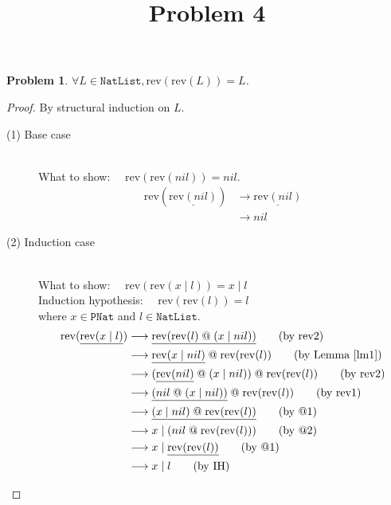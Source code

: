\documentclass[12pt, a4paper]{article}
\title{Problem 4}
\date{\vspace{-5ex}}
\newtheorem{problem}{Problem}
\newcommand{\rel}[1]{\mathrel{#1}}
\newcommand{\rmx}[1]{\mathrm{#1}}
\newcommand{\larrow}{\longrightarrow}
\newcommand{\under}{\underline}
\begin{document}
\maketitle

\begin{problem}
$\forall L \in \mathtt{NatList}, \rmx{rev}(\rmx{rev}(L)) = L$.
\end{problem}
\begin{proof}
By structural induction on $L$.

\begin{description}
\item[(1) Base case]~\\
\noindent
What to show: $\quad\rmx{rev}(\rmx{rev}(nil)) = nil$.
\begin{align*}
\rmx{rev}(\under{\rmx{rev}(nil)})
	&\larrow \under{\rmx{rev}(nil)} \tag{by rev1} \\
	&\larrow nil \tag{by rev1}
\end{align*}

\item[(2) Induction case]~\\
What to show: $\quad \rmx{rev}(\rmx{rev}(x \rel{|} l)) = x \rel{|} l$ \\
Induction hypothesis: $\quad \rmx{rev}(\rmx{rev}(l)) = l$  \\
where $x \in \mathtt{PNat}$ and $l \in \mathtt{NatList}$.
\begin{align*}
\rmx{rev}(\under{\rmx{rev}(x \rel{|} l)})
	&\larrow \under{\rmx{rev}(\rmx{rev}(l) \rel{@} (x \rel{|} nil))} \tag{by rev2} \\
	&\larrow \under{\rmx{rev}(x \rel{|} nil)} \rel{@} \rmx{rev}(\rmx{rev}(l)) \tag{by Lemma~\ref{lm1}} \\
	&\larrow (\under{\rmx{rev}(nil)} \rel{@} (x \rel{|} nil)) \rel{@} \rmx{rev}(\rmx{rev}(l)) \tag{by rev2} \\
	&\larrow \under{(nil \rel{@} (x \rel{|} nil))} \rel{@} \rmx{rev}(\rmx{rev}(l)) \tag{by rev1} \\
	&\larrow \under{(x \rel{|} nil) \rel{@} \rmx{rev}(\rmx{rev}(l))} \tag{by @1} \\
	&\larrow x \rel{|} (nil \rel{@} \rmx{rev}(\rmx{rev}(l))) \tag{by @2} \\
	&\larrow x \rel{|} \under{\rmx{rev}(\rmx{rev}(l))} \tag{by @1} \\
	&\larrow x \rel{|} l \tag{by IH}
\end{align*}

\end{description}

\end{proof}
\end{document}
